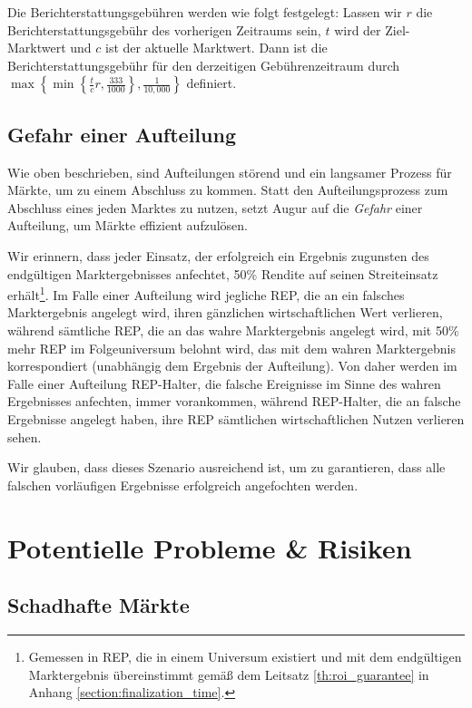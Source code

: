 \documentclass[floatfix,reprint,nofootinbib,amsmath,amssymb,epsfig,pre,floats,letterpaper,groupedaffiliation]{revtex4-1}
\theoremstyle{definition}
\theoremstyle{definition}
\theoremstyle{definition}
\begin{document}
Die Berichterstattungsgebühren werden wie folgt festgelegt: Lassen wir $r$ die Berichterstattungsgebühr des vorherigen Zeitraums sein, $t$ wird der Ziel-Marktwert und $c$ ist der aktuelle Marktwert. Dann ist die Berichterstattungsgebühr für den derzeitigen Gebührenzeitraum durch $\max\left\{ \min\left\{\frac{t}{c}r, \frac{333}{1000}\right\} , \frac{1}{10,000}\right\}$ definiert.

\subsection{Gefahr einer Aufteilung}\label{section:leveraging_the_threat_of_a_fork}

Wie oben beschrieben, sind Aufteilungen störend und ein langsamer Prozess für Märkte, um zu einem Abschluss zu kommen. Statt den Aufteilungsprozess zum Abschluss eines jeden Marktes zu nutzen, setzt Augur auf die \textit{Gefahr} einer Aufteilung, um Märkte effizient aufzulösen.

Wir erinnern, dass jeder Einsatz, der erfolgreich ein Ergebnis zugunsten des endgültigen Marktergebnisses anfechtet, 50\% Rendite auf seinen Streiteinsatz erhält\footnote{Gemessen in REP, die in einem Universum existiert und mit dem endgültigen Marktergebnis übereinstimmt gemäß dem Leitsatz \ref{th:roi_guarantee} in Anhang \ref{section:finalization_time}.}. Im Falle einer Aufteilung wird jegliche REP, die an ein falsches Marktergebnis angelegt wird, ihren gänzlichen wirtschaftlichen Wert verlieren, während sämtliche REP, die an das wahre Marktergebnis angelegt wird, mit 50\% mehr REP im Folgeuniversum belohnt wird, das mit dem wahren Marktergebnis korrespondiert (unabhängig dem Ergebnis der Aufteilung). Von daher werden im Falle einer Aufteilung REP-Halter, die falsche Ereignisse im Sinne des wahren Ergebnisses anfechten, immer vorankommen, während REP-Halter, die an falsche Ergebnisse angelegt haben, ihre REP sämtlichen wirtschaftlichen Nutzen verlieren sehen.

Wir glauben, dass dieses Szenario ausreichend ist, um zu garantieren, dass alle falschen vorläufigen Ergebnisse erfolgreich angefochten werden.

\section{Potentielle Probleme \& Risiken}

\subsection{Schadhafte Märkte}
\end{document}
